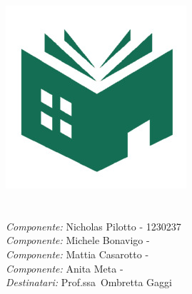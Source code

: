 \makeatletter
    \begin{titlepage}
        \begin{center}
            \includegraphics[width=0.4\linewidth]{images/icon.jpg}\\[10ex]
            {\huge \bfseries  \@title }\\[5ex]
            {\large \@date} \\[10ex]
            {\large \textit{Componente:} Nicholas Pilotto - 1230237} \\[2ex]
            {\large \textit{Componente:} Michele Bonavigo - } \\[2ex]
            {\large \textit{Componente:} Mattia Casarotto - } \\[2ex]
            {\large \textit{Componente:} Anita Meta - } \\[2ex]
            {\large \textit{Destinatari:} Prof.ssa\ Ombretta Gaggi} \\[2ex]
        \end{center}
    \end{titlepage}
\makeatother
\thispagestyle{empty}
\newpage